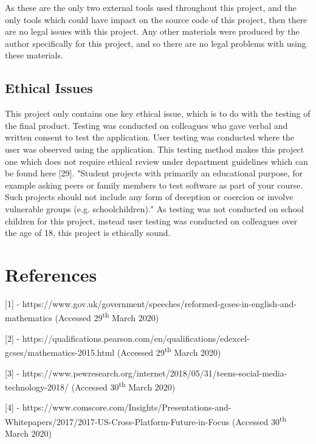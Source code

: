 \documentclass{article}
\begin{document}
As these are the only two external tools used throughout this project, and the only tools which could have impact on the source code of this project, then there are no legal issues with this project. Any other materials were produced by the author specifically for this project, and so there are no legal problems with using these materials. \par

\subsection{Ethical Issues}

This project only contains one key ethical issue, which is to do with the testing of the final product. Testing was conducted on colleagues who gave verbal and written consent to test the application. User testing was conducted where the user was observed using the application. This testing method makes this project one which does not require ethical review under department guidelines which can be found here [29]. "Student projects with primarily an educational purpose, for example asking peers or family members to test software as part of your course. Such projects should not include any form of deception or coercion or involve vulnerable groups (e.g. schoolchildren)." As testing was not conducted on school children for this project, instead user testing was conducted on colleagues over the age of 18, this project is ethically sound. 

\section{References}
\label{section:references}

[1] - https://www.gov.uk/government/speeches/reformed-gcses-in-english-and-mathematics (Accessed 29\textsuperscript{th} March 2020) \par

[2] - https://qualifications.pearson.com/en/qualifications/edexcel-gcses/mathematics-2015.html (Accessed 29\textsuperscript{th} March 2020) \par

[3] - https://www.pewresearch.org/internet/2018/05/31/teens-social-media-technology-2018/ (Accessed 30\textsuperscript{th} March 2020) \par

[4] - https://www.comscore.com/Insights/Presentations-and-Whitepapers/2017/2017-US-Cross-Platform-Future-in-Focus (Accessed 30\textsuperscript{th} March 2020) \par
\end{document}

